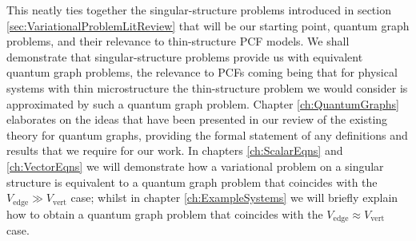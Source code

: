 This neatly ties together the singular-structure problems introduced in section \ref{sec:VariationalProblemLitReview} that will be our starting point, quantum graph problems, and their relevance to thin-structure PCF models.
We shall demonstrate that singular-structure problems provide us with equivalent quantum graph problems, the relevance to PCFs coming being that for physical systems with thin microstructure the thin-structure problem we would consider is approximated by such a quantum graph problem.
Chapter \ref{ch:QuantumGraphs} elaborates on the ideas that have been presented in our review of the existing theory for quantum graphs, providing the formal statement of any definitions and results that we require for our work.
In chapters \ref{ch:ScalarEqns} and \ref{ch:VectorEqns} we will demonstrate how a variational problem on a singular structure is equivalent to a quantum graph problem that coincides with the $V_{\mathrm{edge}} \gg V_{\mathrm{vert}}$ case; whilst in chapter \ref{ch:ExampleSystems} we will briefly explain how to obtain a quantum graph problem that coincides with the $V_{\mathrm{edge}} \approx V_{\mathrm{vert}}$ case.

